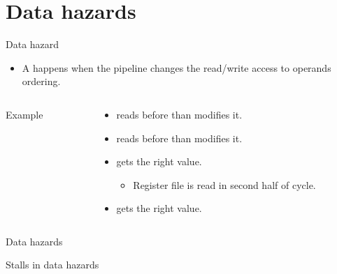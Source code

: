\section{Data hazards}

\begin{frame}[t,fragile]{Data hazard}
\begin{itemize}
  \item A  happens when the pipeline changes
        the read/write access to operands ordering.
\end{itemize}
\begin{columns}
\begin{column}{.45\textwidth}
\begin{block}{Example}

\end{block}
\end{column}
\begin{column}{.55\textwidth}
\begin{itemize}
  \item {} reads  before than  modifies it.
  \item {} reads  before than  modifies it.
  \item {} gets the right value.
    \begin{itemize}
      \item Register file is read in second half of cycle.
    \end{itemize}
  \item {} gets the right value.
\end{itemize}
\end{column}
\end{columns}
\end{frame}
      
\begin{frame}[t]{Data hazards}
\makebox[\textwidth][c]{

}
\end{frame}

\begin{frame}[t]{Stalls in data hazards}
\makebox[\textwidth][c]{

}
\end{frame}

